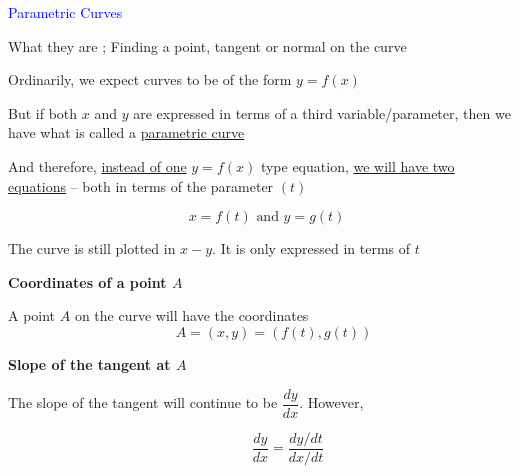 \documentclass[14pt,fleqn]{extarticle}
\begin{document}
\begin{skill}
\begin{narrow}
\textcolor{blue}{Parametric Curves}

What they are ; Finding a point, tangent or normal on the curve

\end{narrow}
%

\reason

Ordinarily, we expect curves to
be of the form $y = f(x)$ \newline 

But if both $x$ and $y$ are expressed
in terms of a third variable/parameter,
then we have what is called a 
\underline{parametric curve}\newline 

And therefore, \underline{instead of one} $y = f(x)$ type equation,
\underline{we will have two equations} -- both in terms 
of the parameter $(t)$

\[ \quad x = f(t)  \text{ and }  y = g(t) \]

The curve is still plotted in $x-y$. It is only expressed in terms of $t$\newline 

 \textbf{Coordinates of a point $A$}\newline 
 
 A point $A$ on the curve will have 
 the coordinates 
 \[ \qquad A = (x,y) = \left(f(t), g(t) \right)\]

\textbf{Slope of the tangent at $A$}\newline
 
 The slope of the tangent will continue
 to be $\dfrac{dy}{dx}$. However, 

 \[ \qquad\qquad \dfrac{dy}{dx} = \frac{dy / dt}{dx / dt}\]
 
%


\end{skill}
\end{document}
